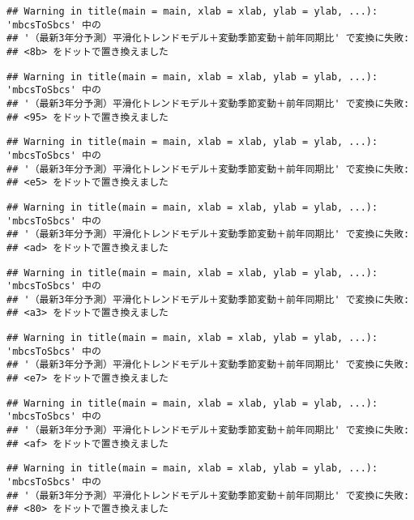 \documentclass[]{article}
\begin{document}
\begin{verbatim}
## Warning in title(main = main, xlab = xlab, ylab = ylab, ...): 'mbcsToSbcs' 中の
## '（最新3年分予測）平滑化トレンドモデル＋変動季節変動＋前年同期比' で変換に失敗:
## <8b> をドットで置き換えました
\end{verbatim}

\begin{verbatim}
## Warning in title(main = main, xlab = xlab, ylab = ylab, ...): 'mbcsToSbcs' 中の
## '（最新3年分予測）平滑化トレンドモデル＋変動季節変動＋前年同期比' で変換に失敗:
## <95> をドットで置き換えました
\end{verbatim}

\begin{verbatim}
## Warning in title(main = main, xlab = xlab, ylab = ylab, ...): 'mbcsToSbcs' 中の
## '（最新3年分予測）平滑化トレンドモデル＋変動季節変動＋前年同期比' で変換に失敗:
## <e5> をドットで置き換えました
\end{verbatim}

\begin{verbatim}
## Warning in title(main = main, xlab = xlab, ylab = ylab, ...): 'mbcsToSbcs' 中の
## '（最新3年分予測）平滑化トレンドモデル＋変動季節変動＋前年同期比' で変換に失敗:
## <ad> をドットで置き換えました
\end{verbatim}

\begin{verbatim}
## Warning in title(main = main, xlab = xlab, ylab = ylab, ...): 'mbcsToSbcs' 中の
## '（最新3年分予測）平滑化トレンドモデル＋変動季節変動＋前年同期比' で変換に失敗:
## <a3> をドットで置き換えました
\end{verbatim}

\begin{verbatim}
## Warning in title(main = main, xlab = xlab, ylab = ylab, ...): 'mbcsToSbcs' 中の
## '（最新3年分予測）平滑化トレンドモデル＋変動季節変動＋前年同期比' で変換に失敗:
## <e7> をドットで置き換えました
\end{verbatim}

\begin{verbatim}
## Warning in title(main = main, xlab = xlab, ylab = ylab, ...): 'mbcsToSbcs' 中の
## '（最新3年分予測）平滑化トレンドモデル＋変動季節変動＋前年同期比' で変換に失敗:
## <af> をドットで置き換えました
\end{verbatim}

\begin{verbatim}
## Warning in title(main = main, xlab = xlab, ylab = ylab, ...): 'mbcsToSbcs' 中の
## '（最新3年分予測）平滑化トレンドモデル＋変動季節変動＋前年同期比' で変換に失敗:
## <80> をドットで置き換えました
\end{verbatim}
\end{document}
